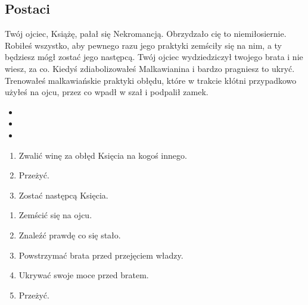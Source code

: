 	\subsection{Postaci}
	\label{sec:characters}
			{}{
			Twój ojciec, Książę, pałał się Nekromancją.
			Obrzydzało cię to niemiłosiernie.
			Robiłeś wszystko, aby pewnego razu jego praktyki zemściły się na nim, a ty będziesz mógł zostać jego następcą.
			Twój ojciec wydziedziczył twojego brata i nie wiesz, za co.
			Kiedyś zdiabolizowałeś Malkawianina i bardzo pragniesz to ukryć.
			Trenowałeś malkawiańskie praktyki obłędu, które w trakcie kłótni przypadkowo użyłeś na ojcu, przez co wpadł w szał i podpalił zamek.}
			{
				\begin{itemize}[noitemsep]
					\item {}
					\item {}
					\item {}
				\end{itemize}

			}{
				\begin{enumerate}[noitemsep]
					\item Zwalić winę za obłęd Księcia na kogoś innego.
					\item Przeżyć.
					\item Zostać następcą Księcia.
				\end{enumerate}
			}
			{}
			
			{}{
				\begin{enumerate}[noitemsep]
					\item Zemścić się na ojcu.
					\item Znaleźć prawdę co się stało.
					\item Powstrzymać brata przed przejęciem władzy.
					\item Ukrywać swoje moce przed bratem.
					\item Przeżyć.
				\end{enumerate}
			}{
			}
			
